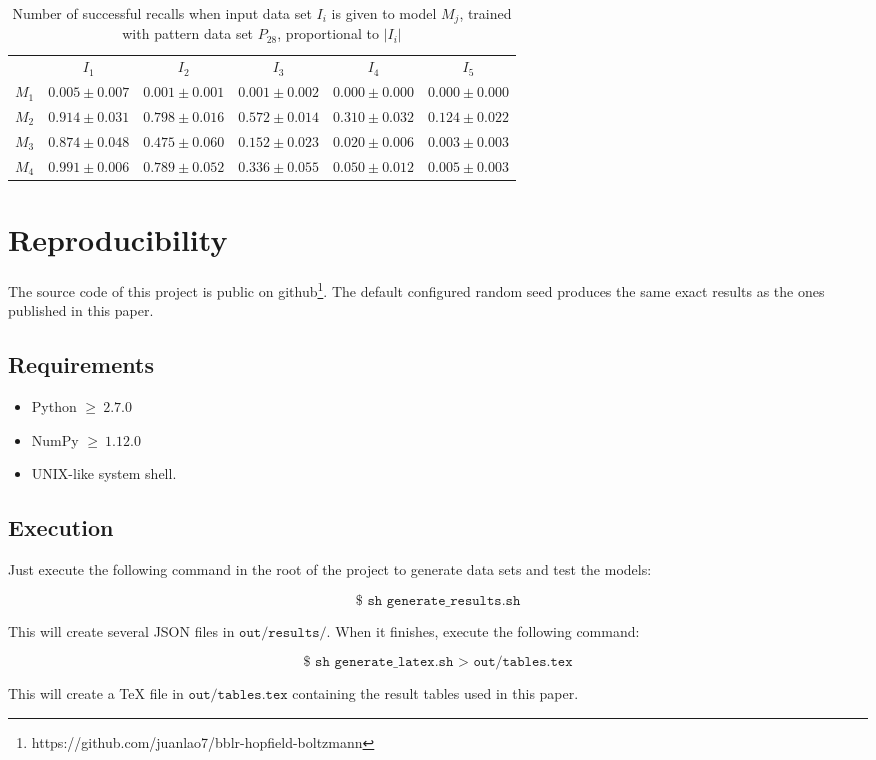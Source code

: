 \documentclass[anon]{CI}
\begin{document}
		\begin{table}[H]
			\centering
			\def\arraystretch{1.5}
			\footnotesize
			\begin{tabular}{cccccc}
				
				& $I_{1}$  & $I_{2}$  & $I_{3}$  & $I_{4}$  & $I_{5}$ \\ \cline{2-6}
				$M_{1}$  & $0.005\pm0.007$  & $0.001\pm0.001$  & $0.001\pm0.002$  & $0.000\pm0.000$  & $0.000\pm0.000$ \\
				$M_{2}$  & $0.914\pm0.031$  & $0.798\pm0.016$  & $0.572\pm0.014$  & $0.310\pm0.032$  & $0.124\pm0.022$ \\
				$M_{3}$  & $0.874\pm0.048$  & $0.475\pm0.060$  & $0.152\pm0.023$  & $0.020\pm0.006$  & $0.003\pm0.003$ \\
				$M_{4}$  & $0.991\pm0.006$  & $0.789\pm0.052$  & $0.336\pm0.055$  & $0.050\pm0.012$  & $0.005\pm0.003$ \\
				
			\end{tabular}
			\caption{Number of successful recalls when input data set $I_i$ is given to model $M_j$, trained with pattern data set $P_{28}$, proportional to $\left|I_i\right|$}
		\end{table}
		
	\section{Reproducibility}\label{AppF}
	The source code of this project is public on github\footnote{https://github.com/juanlao7/bblr-hopfield-boltzmann}. The default configured random seed produces the same exact results as the ones published in this paper.
	\subsection{Requirements}
	\begin{itemize}
		\item Python $ \geq \ 2.7.0$
		\item NumPy $ \geq \  1.12.0$
		\item UNIX-like system shell.
	\end{itemize}
	
	\subsection{Execution}
	Just execute the following command in the root of the project to generate data sets and test the models:
	
	$$\texttt{\$\ sh\ generate\_results.sh}$$
	
	
	This will create several JSON files in $ \texttt{out/results/} $. When it finishes, execute the following command:
	
	$$\texttt{\$\ sh\ generate\_latex.sh\ >\ out/tables.tex}$$
	
	This will create a TeX file in $ \texttt{out/tables.tex} $ containing the result tables used in this paper.
	
\end{document}
